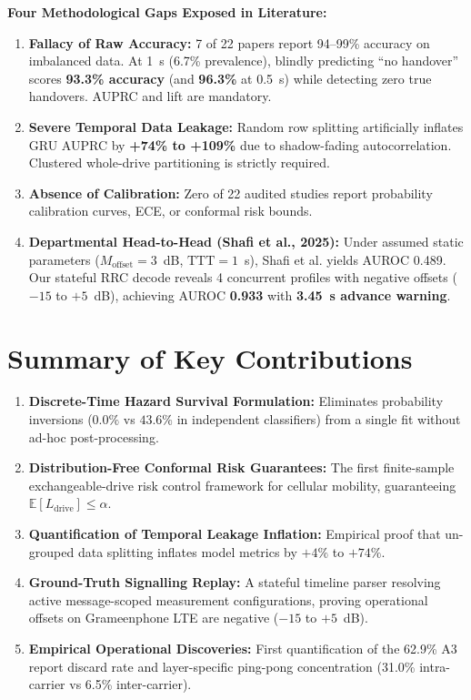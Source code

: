 \documentclass[10pt,a4paper]{article}
\begin{document}
\vspace{3pt}
\textbf{\color{NavyBlue}Four Methodological Gaps Exposed in Literature:}
\begin{enumerate}[itemsep=3.0pt, topsep=2.5pt]
    \item \textbf{Fallacy of Raw Accuracy:} 7 of 22 papers report 94--99\% accuracy on imbalanced data. At 1~s (6.7\% prevalence), blindly predicting ``no handover'' scores \textbf{93.3\% accuracy} (and \textbf{96.3\%} at 0.5~s) while detecting zero true handovers. AUPRC and lift are mandatory.
    \item \textbf{Severe Temporal Data Leakage:} Random row splitting artificially inflates GRU AUPRC by \textbf{+74\% to +109\%} due to shadow-fading autocorrelation. Clustered whole-drive partitioning is strictly required.
    \item \textbf{Absence of Calibration:} Zero of 22 audited studies report probability calibration curves, ECE, or conformal risk bounds.
    \item \textbf{Departmental Head-to-Head (Shafi et al., 2025):} Under assumed static parameters ($M_{\text{offset}}=3$~dB, $\text{TTT}=1$~s), Shafi et al. yields AUROC 0.489. Our stateful RRC decode reveals 4 concurrent profiles with negative offsets ($-15$ to $+5$~dB), achieving AUROC \textbf{0.933} with \textbf{3.45~s advance warning}.
\end{enumerate}

\section{Summary of Key Contributions}
\begin{enumerate}[itemsep=3.0pt, topsep=2.5pt]
    \item \textbf{Discrete-Time Hazard Survival Formulation:} Eliminates probability inversions ($0.0\%$ vs $43.6\%$ in independent classifiers) from a single fit without ad-hoc post-processing.
    \item \textbf{Distribution-Free Conformal Risk Guarantees:} The first finite-sample exchangeable-drive risk control framework for cellular mobility, guaranteeing $\mathbb{E}[L_{\text{drive}}] \le \alpha$.
    \item \textbf{Quantification of Temporal Leakage Inflation:} Empirical proof that un-grouped data splitting inflates model metrics by $+4\%$ to $+74\%$.
    \item \textbf{Ground-Truth Signalling Replay:} A stateful timeline parser resolving active message-scoped measurement configurations, proving operational offsets on Grameenphone LTE are negative ($-15$ to $+5$~dB).
    \item \textbf{Empirical Operational Discoveries:} First quantification of the 62.9\% A3 report discard rate and layer-specific ping-pong concentration (31.0\% intra-carrier vs 6.5\% inter-carrier).
\end{enumerate}
\end{document}

